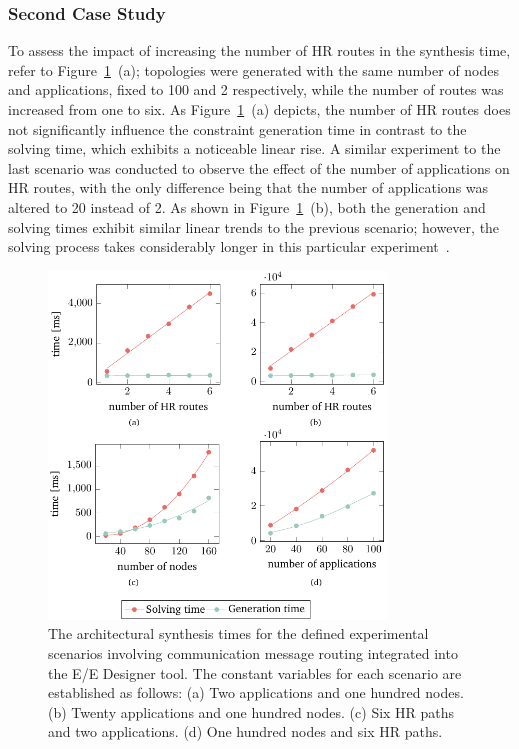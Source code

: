     


    \subsubsection{Second Case Study}
    To assess the impact of increasing the number of HR routes in the synthesis time, refer to Figure~\ref{fig71}~(a); topologies were generated with the same number of nodes and applications, fixed to 100 and 2 respectively, while the number of routes was increased from one to six. As Figure~\ref{fig71}~(a) depicts, the number of HR routes does not significantly influence the constraint generation time in contrast to the solving time, which exhibits a noticeable linear rise. A similar experiment to the last scenario was conducted to observe the effect of the number of applications on HR routes, with the only difference being that the number of applications was altered to 20 instead of 2. As shown in Figure~\ref{fig71}~(b), both the generation and solving times exhibit similar linear trends to the previous scenario; however, the solving process takes considerably longer in this particular experiment~\cite{9565115}.
	
	\begin{figure}[ht]
	\centering
	\includegraphics[width=0.8\textwidth]{figures/routing_cropped.pdf}
	\caption{The architectural synthesis times for the defined experimental scenarios involving communication message routing integrated into the E/E Designer tool. The constant variables for each scenario are established as follows: (a) Two applications and one hundred nodes. (b) Twenty applications and one hundred nodes. (c) Six HR paths and two applications. (d) One hundred nodes and six HR paths.}
	\label{fig71}
	\end{figure}
 
